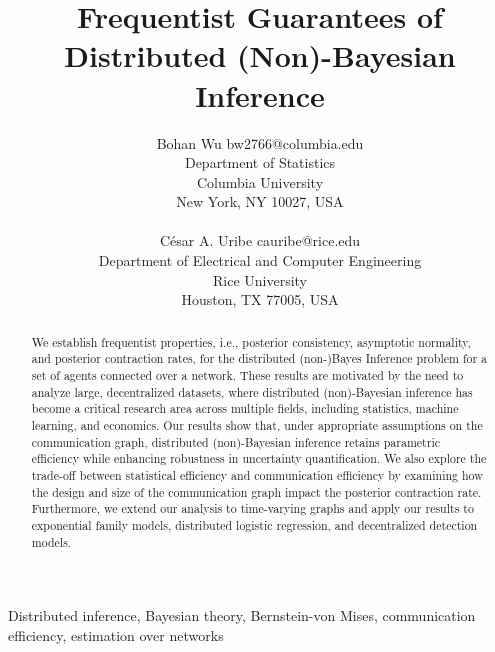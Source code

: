 \documentclass[twoside,11pt]{article}
\numberwithin{equation}{section}
\begin{document}

\title{Frequentist Guarantees of Distributed (Non)-Bayesian Inference}

\author{\name Bohan Wu \email bw2766@columbia.edu\\
       \addr Department of Statistics\\
       Columbia University\\
       New York, NY 10027, USA \\
       \\
       \name César A. Uribe \email cauribe@rice.edu\\
       \addr Department of Electrical and Computer Engineering\\
       Rice University\\
        Houston, TX 77005, USA
       }

\maketitle

\begin{abstract}%
We establish frequentist properties, i.e., posterior consistency, asymptotic normality, and posterior contraction rates, for the distributed (non-)Bayes Inference problem for a set of agents connected over a network. These results are motivated by the need to analyze large, decentralized datasets, where distributed (non)-Bayesian inference has become a critical research area across multiple fields, including statistics, machine learning, and economics. Our results show that, under appropriate assumptions on the communication graph, distributed (non)-Bayesian inference retains parametric efficiency while enhancing robustness in uncertainty quantification.  We also explore the trade-off between statistical efficiency and communication efficiency by examining how the design and size of the communication graph impact the posterior contraction rate. Furthermore, we extend our analysis to time-varying graphs and apply our results to exponential family models, distributed logistic regression, and decentralized detection models. 

\end{abstract}

\begin{keywords}
  Distributed inference, Bayesian theory, Bernstein-von Mises, communication efficiency, estimation over networks
\end{keywords}
\end{document}
